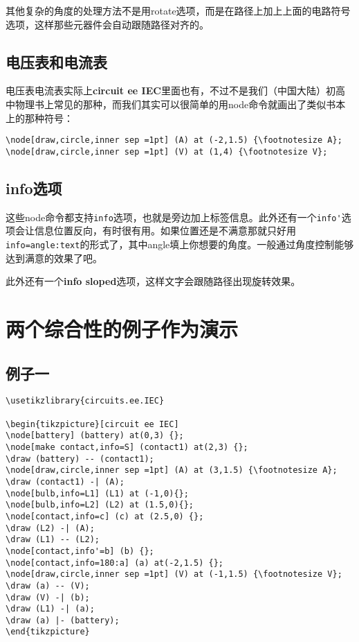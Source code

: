 \documentclass[11pt,oneside]{book}
\begin{document}
\begin{common-format}
其他复杂的角度的处理方法不是用rotate选项，而是在路径上加上上面的电路符号选项，这样那些元器件会自动跟随路径对齐的。


\subsection{电压表和电流表}
电压表电流表实际上\textbf{circuit ee IEC}里面也有，不过不是我们（中国大陆）初高中物理书上常见的那种，而我们其实可以很简单的用node命令就画出了类似书本上的那种符号：
\begin{Verbatim}
\node[draw,circle,inner sep =1pt] (A) at (-2,1.5) {\footnotesize A};
\node[draw,circle,inner sep =1pt] (V) at (1,4) {\footnotesize V};
\end{Verbatim}



\subsection{info选项}
这些node命令都支持\verb+info+选项，也就是旁边加上标签信息。此外还有一个\verb+info'+选项会让信息位置反向，有时很有用。如果位置还是不满意那就只好用\verb+info=angle:text+的形式了，其中angle填上你想要的角度。一般通过角度控制能够达到满意的效果了吧。

此外还有一个\textbf{info sloped}选项，这样文字会跟随路径出现旋转效果。


\section{两个综合性的例子作为演示}
\subsection{例子一}
\begin{Verbatim}
\usetikzlibrary{circuits.ee.IEC}

\begin{tikzpicture}[circuit ee IEC]
\node[battery] (battery) at(0,3) {};
\node[make contact,info=S] (contact1) at(2,3) {};
\draw (battery) -- (contact1);
\node[draw,circle,inner sep =1pt] (A) at (3,1.5) {\footnotesize A};
\draw (contact1) -| (A);
\node[bulb,info=L1] (L1) at (-1,0){};
\node[bulb,info=L2] (L2) at (1.5,0){};
\node[contact,info=c] (c) at (2.5,0) {};
\draw (L2) -| (A);
\draw (L1) -- (L2);
\node[contact,info'=b] (b) {};
\node[contact,info=180:a] (a) at(-2,1.5) {};
\node[draw,circle,inner sep =1pt] (V) at (-1,1.5) {\footnotesize V};
\draw (a) -- (V);
\draw (V) -| (b);
\draw (L1) -| (a);
\draw (a) |- (battery);
\end{tikzpicture}
\end{Verbatim}



\end{common-format}
\end{document}
